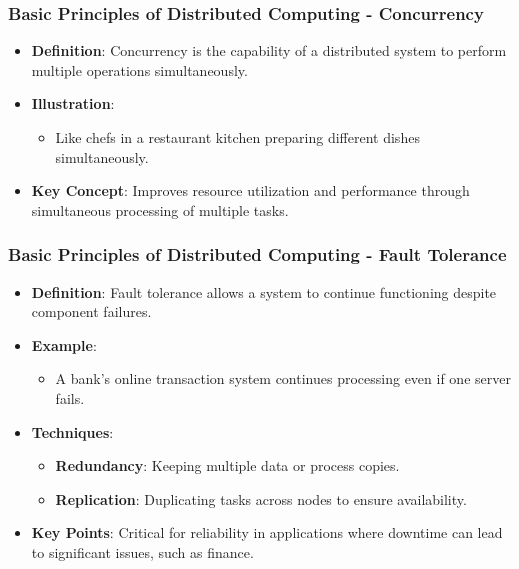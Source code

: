 \documentclass[aspectratio=169]{beamer}
\begin{document}
\begin{frame}[fragile]
    \frametitle{Basic Principles of Distributed Computing - Concurrency}
    \begin{itemize}
        \item \textbf{Definition}: Concurrency is the capability of a distributed system to perform multiple operations simultaneously.
        \item \textbf{Illustration}: 
        \begin{itemize}
            \item Like chefs in a restaurant kitchen preparing different dishes simultaneously.
        \end{itemize}
        \item \textbf{Key Concept}: Improves resource utilization and performance through simultaneous processing of multiple tasks.
    \end{itemize}
\end{frame}

\begin{frame}[fragile]
    \frametitle{Basic Principles of Distributed Computing - Fault Tolerance}
    \begin{itemize}
        \item \textbf{Definition}: Fault tolerance allows a system to continue functioning despite component failures.
        \item \textbf{Example}:
        \begin{itemize}
            \item A bank's online transaction system continues processing even if one server fails.
        \end{itemize}
        \item \textbf{Techniques}:
        \begin{itemize}
            \item \textbf{Redundancy}: Keeping multiple data or process copies.
            \item \textbf{Replication}: Duplicating tasks across nodes to ensure availability.
        \end{itemize}
        \item \textbf{Key Points}: Critical for reliability in applications where downtime can lead to significant issues, such as finance.
    \end{itemize}
\end{frame}
\end{document}
